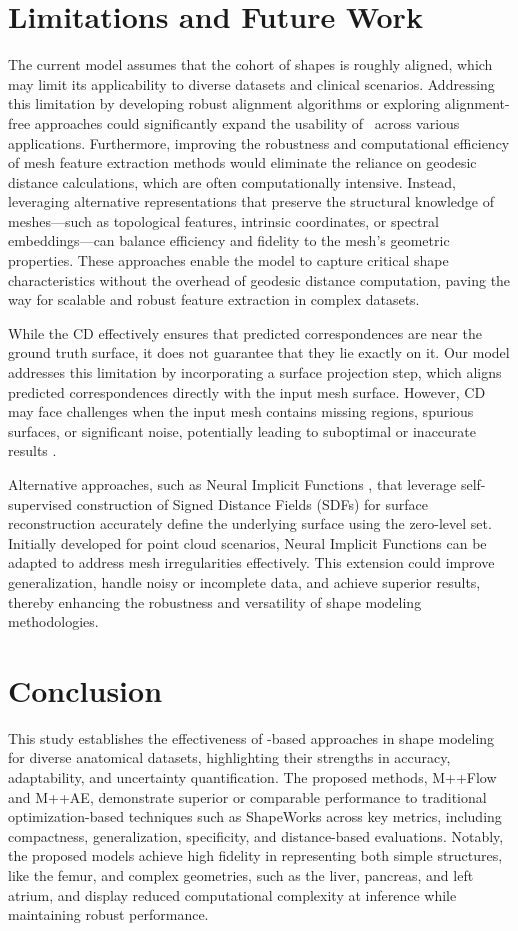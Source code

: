 \section{Limitations and Future Work}
The current model assumes that the cohort of shapes is roughly aligned, which may limit its applicability to diverse datasets and clinical scenarios. Addressing this limitation by developing robust alignment algorithms or exploring alignment-free approaches could significantly expand the usability of \model~across various applications. Furthermore, improving the robustness and computational efficiency of mesh feature extraction methods would eliminate the reliance on geodesic distance calculations, which are often computationally intensive. Instead, leveraging alternative representations that preserve the structural knowledge of meshes—such as topological features, intrinsic coordinates, or spectral embeddings—can balance efficiency and fidelity to the mesh's geometric properties. These approaches enable the model to capture critical shape characteristics without the overhead of geodesic distance computation, paving the way for scalable and robust feature extraction in complex datasets.

While the CD effectively ensures that predicted correspondences are near the ground truth surface, it does not guarantee that they lie exactly on it. Our model addresses this limitation by incorporating a surface projection step, which aligns predicted correspondences directly with the input mesh surface. However, CD may face challenges when the input mesh contains missing regions, spurious surfaces, or significant noise, potentially leading to suboptimal or inaccurate results \cite{araslanovdiffcd}.

Alternative approaches, such as Neural Implicit Functions \cite{wang2023neural}, that leverage self-supervised construction of Signed Distance Fields (SDFs) for surface reconstruction accurately define the underlying surface using the zero-level set. Initially developed for point cloud scenarios, Neural Implicit Functions can be adapted to address mesh irregularities effectively. This extension could improve generalization, handle noisy or incomplete data, and achieve superior results, thereby enhancing the robustness and versatility of shape modeling methodologies.

\section{Conclusion}
This study establishes the effectiveness of \model-based approaches in shape modeling for diverse anatomical datasets, highlighting their strengths in accuracy, adaptability, and uncertainty quantification. The proposed methods, M++Flow and M++AE, demonstrate superior or comparable performance to traditional optimization-based techniques such as ShapeWorks across key metrics, including compactness, generalization, specificity, and distance-based evaluations. Notably, the proposed models achieve high fidelity in representing both simple structures, like the femur, and complex geometries, such as the liver, pancreas, and left atrium, and display reduced computational complexity at inference while maintaining robust performance.

